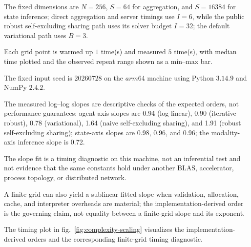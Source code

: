 \documentclass[
  english,
]{article}
\theoremstyle{plain}
\theoremstyle{definition}
\theoremstyle{remark}
\theoremstyle{definition}
\begin{document}
The fixed dimensions are \(N=256\), \(S=64\) for aggregation, and
\(S=16384\) for state inference; direct aggregation and server timings
use \(I=6\), while the public robust self-excluding sharing path uses
its solver budget \(I=32\); the default variational path uses \(B=3\).

Each grid point is warmed up \(1\) time(s) and measured \(5\) time(s),
with median time plotted and the observed repeat range shown as a
min--max bar.

The fixed input seed is \(20260728\) on the \(arm64\) machine using
Python \(3.14.9\) and NumPy \(2.4.2\).

The measured log--log slopes are descriptive checks of the expected
orders, not performance guarantees: agent-axis slopes are 0.94
(log-linear), 0.90 (iterative robust), 0.78 (variational), 1.64 (naive
self-excluding sharing), and 1.91 (robust self-excluding sharing);
state-axis slopes are 0.98, 0.96, and 0.96; the modality-axis inference
slope is 0.72.

The slope fit is a timing diagnostic on this machine, not an inferential
test and not evidence that the same constants hold under another BLAS,
accelerator, process topology, or distributed network.

A finite grid can also yield a sublinear fitted slope when validation,
allocation, cache, and interpreter overheads are material; the
implementation-derived order is the governing claim, not equality
between a finite-grid slope and its exponent.

The timing plot in fig.~\ref{fig:complexity-scaling} visualizes the
implementation-derived orders and the corresponding finite-grid timing
diagnostic.
\end{document}

